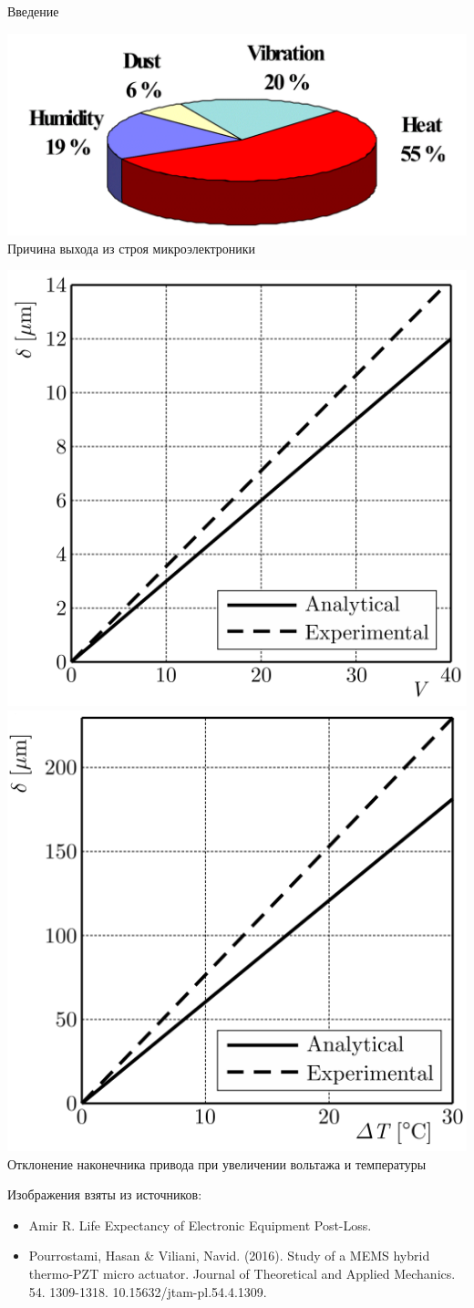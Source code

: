 \begin{frame}{Введение}
	\begin{minipage}{0.39\textwidth}
	\begin{center}
		\includegraphics[width=\linewidth]{pics/EquipmentFailure.png} \\
		Причина выхода из строя микроэлектроники
	\end{center}
	\end{minipage}
	\hfill
	\begin{minipage}{0.59\textwidth}
		\includegraphics[width=0.49\linewidth]{pics/VoltageVariation.png}
		\includegraphics[width=0.49\linewidth]{pics/TemperatureVariation.png} \\
		Отклонение наконечника привода при увеличении вольтажа и температуры
	\end{minipage}
	
	\bigskip	
	
	Изображения взяты из источников:
	\begin{itemize}
		\justifying
		\item Amir R. Life Expectancy of Electronic Equipment Post-Loss.
		\item Pourrostami, Hasan \& Viliani, Navid. (2016). Study of a MEMS hybrid thermo-PZT micro actuator. Journal of Theoretical and Applied Mechanics. 54. 1309-1318. 10.15632/jtam-pl.54.4.1309. 
	\end{itemize}
\end{frame}


